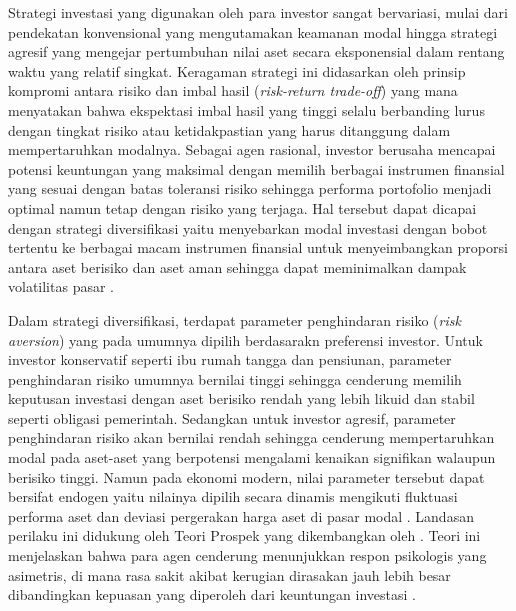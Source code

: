 Strategi investasi yang digunakan oleh para investor sangat bervariasi, mulai dari pendekatan konvensional yang mengutamakan keamanan modal hingga strategi agresif yang mengejar pertumbuhan nilai aset secara eksponensial dalam rentang waktu yang relatif singkat. Keragaman strategi ini didasarkan oleh prinsip kompromi antara risiko dan imbal hasil (\textit{risk-return trade-off}) yang mana menyatakan bahwa ekspektasi imbal hasil yang tinggi selalu berbanding lurus dengan tingkat risiko atau ketidakpastian yang harus ditanggung dalam mempertaruhkan modalnya. Sebagai agen rasional, investor berusaha mencapai potensi keuntungan yang maksimal dengan memilih berbagai instrumen finansial yang sesuai dengan batas toleransi risiko sehingga performa portofolio menjadi optimal namun tetap dengan risiko yang terjaga. Hal tersebut dapat dicapai dengan strategi diversifikasi yaitu menyebarkan modal investasi dengan bobot tertentu ke berbagai macam instrumen finansial untuk menyeimbangkan proporsi antara aset berisiko dan aset aman sehingga dapat meminimalkan dampak volatilitas pasar .

Dalam strategi diversifikasi, terdapat parameter penghindaran risiko (\textit{risk aversion}) yang pada umumnya dipilih berdasarakn preferensi investor. Untuk investor konservatif seperti ibu rumah tangga dan pensiunan, parameter penghindaran risiko umumnya bernilai tinggi sehingga cenderung memilih keputusan investasi dengan aset berisiko rendah yang lebih likuid dan stabil seperti obligasi pemerintah. Sedangkan untuk investor agresif, parameter penghindaran risiko akan bernilai rendah sehingga cenderung mempertaruhkan modal pada aset-aset yang berpotensi mengalami kenaikan signifikan walaupun berisiko tinggi. Namun pada ekonomi modern, nilai parameter tersebut dapat bersifat endogen yaitu nilainya dipilih secara dinamis mengikuti fluktuasi performa aset dan deviasi pergerakan harga aset di pasar modal \cite{levy_arrow-pratt_1991}. Landasan perilaku ini didukung oleh Teori Prospek yang dikembangkan oleh \cite{kahneman_prospect_1979}. Teori ini menjelaskan bahwa para agen cenderung menunjukkan respon psikologis yang asimetris, di mana rasa sakit akibat kerugian dirasakan jauh lebih besar dibandingkan kepuasan yang diperoleh dari keuntungan investasi \cite{kahneman_prospect_1979}. 
 
